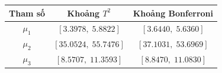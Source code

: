 \begin{center}\begin{tabular}{ccc}\toprule
Tham số & Khoảng $T^2$ & Khoảng Bonferroni\\\midrule
$\mu_1$ & $[3.3978,\;5.8822]$ & $[3.6440,\;5.6360]$\\
$\mu_2$ & $[35.0524,\;55.7476]$ & $[37.1031,\;53.6969]$\\
$\mu_3$ & $[8.5707,\;11.3593]$ & $[8.8470,\;11.0830]$\\
\bottomrule\end{tabular}\end{center}
